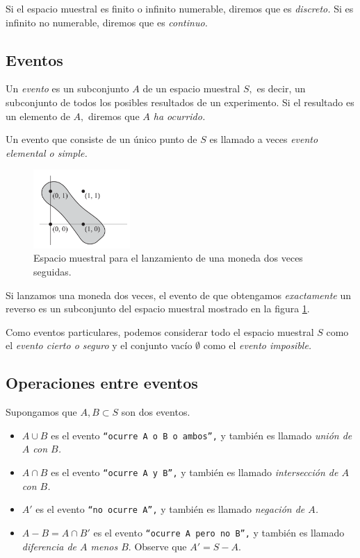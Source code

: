 Si el espacio muestral es finito o infinito numerable, diremos que es \emph{discreto.}  Si es infinito no numerable, diremos que es \emph{continuo.}

\subsection{Eventos}

Un \emph{evento} es un subconjunto $A$ de un espacio muestral $S,$ es decir, un subconjunto de todos los posibles resultados de un experimento. Si el resultado es un elemento de $A,$ diremos que \emph{$A$ ha ocurrido.} 

Un evento que consiste de un único punto de $S$ es llamado a veces \emph{evento elemental o simple.}


\begin{figure}
	\centering
	\includegraphics[height=3cm,keepaspectratio=true]{./pe/pands0102.png}
	\caption{Espacio muestral para el lanzamiento de una moneda dos veces seguidas.}
	\label{pands0102}
\end{figure}



\begin{ejemplo}
	\label{exmp:1.8}
	Si lanzamos una moneda dos veces, el evento de que obtengamos \emph{exactamente} un reverso  es un subconjunto del espacio muestral mostrado en la figura \ref{pands0102}.
\end{ejemplo}



Como eventos particulares, podemos considerar todo el espacio muestral $S$ como el \emph{evento cierto o seguro} y el conjunto vacío $\emptyset$ como el \emph{evento imposible.}


\subsection{Operaciones entre eventos} 
Supongamos que $A,B \subset S$ son dos eventos. 
\begin{itemize}
	\item $A\cup B$ es el evento \texttt{``ocurre $A$ o $B$ o ambos'',} y también es llamado \emph{unión de $A$ con $B$.}  
	\item $A\cap B$ es el evento \texttt{``ocurre $A$ y $B$'',} y también es llamado \emph{intersección de $A$ con $B$.}  
	\item $A'$ es el evento \texttt{``no ocurre $A$'',} y también es llamado \emph{negación de $A$.} 
	\item $A-B=A\cap B'$ es el evento \texttt{``ocurre $A$ pero no $B$'',} y también es llamado \emph{diferencia de $A$ menos $B.$}  Observe que
	$A' = S - A.$
\end{itemize}


